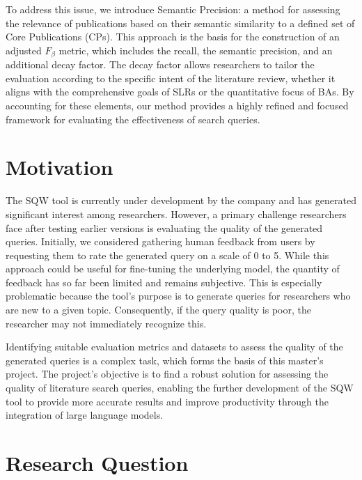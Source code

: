To address this issue, we introduce Semantic Precision: a method for assessing the relevance of publications based on their semantic similarity to a defined set of Core Publications (CPs). This approach is the basis for the construction of an adjusted $F_\beta$ metric, which includes the recall, the semantic precision, and an additional decay factor. The decay factor allows researchers to tailor the evaluation according to the specific intent of the literature review, whether it aligns with the comprehensive goals of SLRs or the quantitative focus of BAs. By accounting for these elements, our method provides a highly refined and focused framework for evaluating the effectiveness of search queries.

\section{Motivation}
The SQW tool is currently under development by the company and has generated significant interest among researchers. However, a primary challenge researchers face after testing earlier versions is evaluating the quality of the generated queries. Initially, we considered gathering human feedback from users by requesting them to rate the generated query on a scale of 0 to 5. While this approach could be useful for fine-tuning the underlying model, the quantity of feedback has so far been limited and remains subjective. This is especially problematic because the tool’s purpose is to generate queries for researchers who are new to a given topic. Consequently, if the query quality is poor, the researcher may not immediately recognize this.

Identifying suitable evaluation metrics and datasets to assess the quality of the generated queries is a complex task, which forms the basis of this master's project. The project’s objective is to find a robust solution for assessing the quality of literature search queries, enabling the further development of the SQW tool to provide more accurate results and improve productivity through the integration of large language models.


\section{Research Question}\label{sec:researchQuestions}

